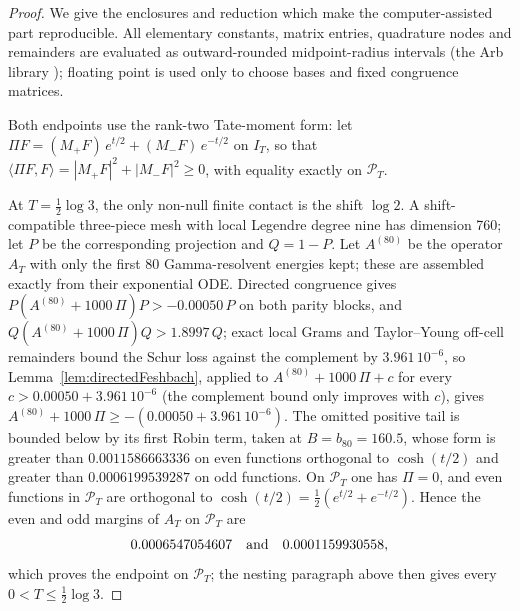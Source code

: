 \documentclass[11pt]{amsart}
\theoremstyle{definition}
\theoremstyle{remark}
\begin{document}
\begin{proof}
We give the enclosures and reduction which make the computer-assisted part
reproducible.  All elementary constants, matrix entries, quadrature nodes
and remainders are evaluated as outward-rounded midpoint-radius intervals
(the Arb library \cite{Arb}); floating
point is used only to choose bases and fixed congruence matrices.

Both endpoints use the rank-two Tate-moment form: let
\(\Pi F=(M_+F)\,e^{t/2}+(M_-F)\,e^{-t/2}\) on \(I_T\), so that
\(\langle\Pi F,F\rangle=|M_+F|^2+|M_-F|^2\ge0\), with equality exactly on
\(\mathcal P_T\).

At \(T=\frac12\log3\), the only non-null finite contact is the shift
\(\log2\).  A shift-compatible three-piece mesh with local Legendre degree
nine has dimension 760; let \(P\) be the corresponding projection and
\(Q=1-P\).  Let \(A^{(80)}\) be the operator \(A_T\) with only the first 80
Gamma-resolvent energies kept; these are assembled exactly from their
exponential ODE.  Directed congruence gives
\(P(A^{(80)}+1000\,\Pi)P>-0.00050\,P\) on both parity blocks, and
\(Q(A^{(80)}+1000\,\Pi)Q>1.8997\,Q\); exact local Grams and Taylor--Young
off-cell remainders bound the Schur loss against the complement by
\(3.961\,10^{-6}\), so Lemma~\ref{lem:directedFeshbach}, applied to
\(A^{(80)}+1000\,\Pi+c\) for every \(c>0.00050+3.961\,10^{-6}\) (the
complement bound only improves with \(c\)), gives
\(A^{(80)}+1000\,\Pi\ge-(0.00050+3.961\,10^{-6})\).  The omitted positive
tail is bounded below by its first Robin term, taken at
\(B=b_{80}=160.5\), whose form is greater than \(0.0011586663336\) on even
functions orthogonal to \(\cosh(t/2)\) and greater than
\(0.0006199539287\) on odd functions.  On \(\mathcal P_T\) one has
\(\Pi=0\), and even functions in \(\mathcal P_T\) are orthogonal to
\(\cosh(t/2)=\frac12(e^{t/2}+e^{-t/2})\).  Hence the even and odd margins
of \(A_T\) on \(\mathcal P_T\) are
\[
 0.0006547054607\quad\hbox{and}\quad0.0001159930558,
\]
which proves the endpoint on \(\mathcal P_T\); the nesting paragraph above
then gives every \(0<T\le\frac12\log3\).


\end{proof}
\end{document}
